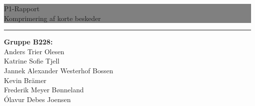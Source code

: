 \newcommand{\HRule}[1]{\hfill \rule{0.2\linewidth}{#1}} 

\thispagestyle{empty} 

\noindent \colorbox{grey}{
	 \parbox[t]{1.0\linewidth}{
		\centering \fontsize{50pt}{80pt}\selectfont
		\vspace*{0.7cm}
		P1-Rapport \\[3pt]
        \LARGE Komprimering af korte beskeder \\ 
		\vspace*{0.7cm}
	}
}

\vfill
\flushright
\flushright \rule[10pt]{0.1pt}{160pt}  \begin{minipage}[b]{0.45\linewidth}
{
\Large
\textbf{Gruppe B228:} \\[4pt]
Anders Trier Olesen\\[.2cm]
Katrine Sofie Tjell\\[.2cm]
Jannek Alexander Westerhof Bossen\\[.2cm]
Kevin Brämer\\[.2cm]
Frederik Meyer Bønneland\\[.2cm]
Ólavur Debes Joensen\\[.2cm]
}
\end{minipage}

\clearpage 
